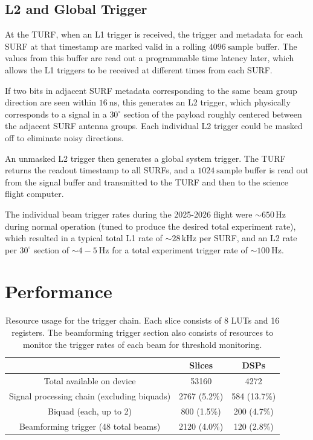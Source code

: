 \documentclass{IEEEtran}
\begin{document}
\subsection{L2 and Global Trigger}

At the TURF, when an L1 trigger is received, the trigger and metadata
for each SURF at that timestamp are marked valid in a rolling
$4096~\text{sample}$ buffer. The values from this buffer are read
out a programmable time latency later, which allows the L1 triggers
to be received at different times from each SURF.

If two bits in adjacent SURF metadata corresponding to the same
beam group direction are seen within $16~\textrm{ns}$, this 
generates an L2 trigger, which physically corresponds to a 
signal in a $30^\circ$ section of the payload roughly centered 
between the adjacent SURF antenna groups. Each
individual L2 trigger could be masked off to eliminate noisy
directions.

An unmasked L2 trigger then generates a global system trigger.
The TURF returns the readout timestamp to all SURFs, and a
$1024~\text{sample}$ buffer is read out from the signal buffer
and transmitted to the TURF and then to the science flight computer.

The individual beam trigger rates during the 2025-2026 flight
were $\sim650\,\mathrm{Hz}$ during normal operation (tuned to
produce the desired total experiment rate), which resulted in a
typical total L1 rate of $\sim28\,\mathrm{kHz}$ per SURF,
and an L2 rate per $30^\circ$ section of $\sim4-5~\mathrm{Hz}$
for a total experiment trigger rate of $\sim 100~\mathrm{Hz}$.


\section{Performance}


\begin{table}
\begin{center}
\begin{tabular}{ |c|c|c| } 
 \hline
    & Slices & DSPs \\
    \hline
    Total available on device & 53160 & 4272  \\
    Signal processing chain (excluding biquads) & 2767 (5.2\%) & 584 (13.7\%) \\
    Biquad (each, up to 2) & 800 (1.5\%) & 200 (4.7\%) \\
    Beamforming trigger (48 total beams) & 2120 (4.0\%) & 120 (2.8\%) \\
 \hline
\end{tabular}
\end{center}
\caption{
\label{tab:resource} Resource usage for the trigger chain.
Each slice consists of 8 LUTs and 16 registers. The beamforming
trigger section also consists of resources to monitor the trigger
rates of each beam for threshold monitoring.
}
\end{table}
\end{document}
